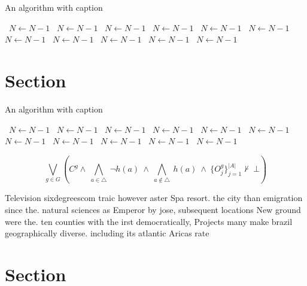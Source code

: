 \documentclass[a4paper]{article}
\begin{document}
\begin{algorithm}
\caption{An algorithm with caption}
\begin{algorithmic}
\    \State $N \gets N - 1$
\    \State $N \gets N - 1$
\    \State $N \gets N - 1$
\    \State $N \gets N - 1$
\    \State $N \gets N - 1$
\    \State $N \gets N - 1$
\    \State $N \gets N - 1$
\    \State $N \gets N - 1$
\    \State $N \gets N - 1$
\    \State $N \gets N - 1$
\    \State $N \gets N - 1$
\EndWhile
\end{algorithmic}
\end{algorithm}

\section{Section}

\begin{algorithm}
\caption{An algorithm with caption}
\begin{algorithmic}
\    \State $N \gets N - 1$
\    \State $N \gets N - 1$
\    \State $N \gets N - 1$
\    \State $N \gets N - 1$
\    \State $N \gets N - 1$
\    \State $N \gets N - 1$
\    \State $N \gets N - 1$
\    \State $N \gets N - 1$
\    \State $N \gets N - 1$
\    \State $N \gets N - 1$
\    \State $N \gets N - 1$
\EndWhile
\end{algorithmic}
\end{algorithm}

\[\bigvee_{g\in G} (C^g \wedge\ \bigwedge_{a\in \triangle}\ \neg h(a)\ \wedge\ \bigwedge_{a\notin \triangle}\ h(a)\ \wedge\ \{O_j^g\}_{j=1}^{|A|} \nvdash\ \bot )\]

Television sixdegreescom traic however aster Spa resort. the city than emigration since the. natural sciences as Emperor by jose, subsequent locations New ground were the. ten counties with the irst democratically, Projects many make brazil geographically diverse. including its atlantic Aricas rate

\section{Section}
\end{document}
